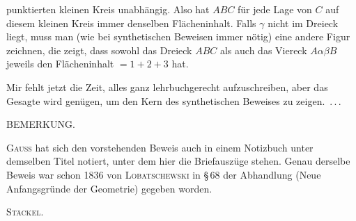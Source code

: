 punktierten kleinen Kreis unabhängig. Also hat $ABC$ für jede Lage von $C$ auf diesem kleinen Kreis immer denselben Flächeninhalt. Falls $\gamma$ nicht im Dreieck liegt, muss man (wie bei synthetischen Beweisen immer nötig) eine andere Figur zeichnen, die zeigt, dass sowohl das Dreieck $ABC$ als auch das Viereck $A\alpha\beta B$ jeweils den Flächeninhalt $=1+2+3$ hat.

\begin{center}\end{center}

Mir fehlt jetzt die Zeit, alles ganz lehrbuchgerecht aufzuschreiben, aber das Gesagte wird genügen, um den Kern des synthetischen Beweises zu \mbox{zeigen. \mbox{.\,.\,.}}

\medskip

\begin{center}
BEMERKUNG.
\end{center}

\textsc{Gauss} hat sich den vorstehenden Beweis auch in einem Notizbuch unter demselben Titel notiert, unter dem hier die Briefauszüge stehen. Genau derselbe Beweis war schon 1836 von \textsc{Lobatschewski} in \S\,68 der Abhandlung  (Neue Anfangsgründe der Geometrie) gegeben worden.

\begin{flushright}
\textsc{Stäckel}.
\end{flushright}
